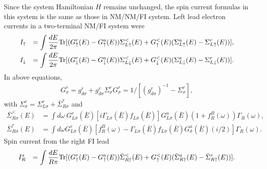 \documentclass[aps,prb,superscriptaddress]{revtex4-2}
\begin{document}
Since the system Hamiltonian $H$ remains unchanged, the spin current formulas in this system is the same as those in NM/NM/FI system. Left lead electron currents in a two-terminal NM/FI system were
\begin{eqnarray}
I_{\uparrow} &&= \int \frac{dE}{2\pi} {\rm Tr} [(G_{\uparrow}^r(E)-G_{\uparrow}^a(E))\Sigma^<_{L\uparrow}(E)+G_{\uparrow}^<(E) (\Sigma_{L\uparrow}^a(E) -\Sigma_{L\uparrow}^r(E))],\\
I_{\downarrow} &&= \int \frac{dE}{2\pi} {\rm Tr} [(G_{\downarrow}^r(E)-G_{\downarrow}^a(E))\Sigma^<_{L\downarrow}(E)+G_{\downarrow}^<(E) (\Sigma_{L\downarrow}^a(E) -\Sigma_{L\downarrow}^r(E))].
\end{eqnarray}
In above equations, 
\begin{eqnarray}
G^r_{\sigma} =g^r_{d\sigma} + g^r_{d\sigma} \Sigma_{\sigma}^r G^r_{\sigma} = 1/[(g^r_{d\sigma})^{-1} - \Sigma_{\sigma}^r],
\end{eqnarray}
with $\Sigma_{\sigma}^r = \Sigma_{L\sigma}^r +  {\bar \Sigma}_{R\sigma}^r$ and
\begin{eqnarray}
{\bar \Sigma}^<_{R\sigma}(E) &= \int d\omega ~ G^r_{L\bar\sigma}({\bar E})[i \Gamma_{L\bar\sigma}({\bar E}) f_{L\bar\sigma}({\bar E})] G^a_{L\bar\sigma}({\bar E})(1+f_R^B(\omega)) \Gamma_R(\omega),\label{eq:less} \\
{\bar \Sigma}^r_{R\sigma}(E)&= \int d\omega G^r_{L\bar\sigma}({\bar E})[f^B_R(\omega)-\Gamma_{L\bar\sigma}({\bar E}) f_{L\bar\sigma}({\bar E})G^a_{\bar\sigma}({\bar E})(i/2)]\Gamma_R(\omega).\label{eq:r}
\end{eqnarray}
Spin current from the right FI lead
\begin{eqnarray}
I_R^s &&= \int \frac{dE}{R\pi} {\rm Tr} [(G_{\uparrow}^r(E)-G_{\uparrow}^a(E))\bar\Sigma^<_{R\uparrow}(E)+G_{\uparrow}^<(E) (\bar\Sigma_{R\uparrow}^a(E) -\bar\Sigma_{R\uparrow}^r(E))].
\end{eqnarray}
\end{document}
